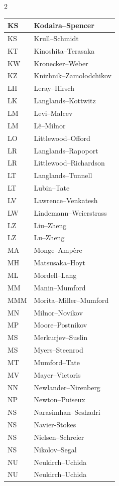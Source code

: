 \documentclass{amsart}
\numberwithin{equation}{section}
\theoremstyle{plain}
\numberwithin{equation}{section}
\theoremstyle{remark}
\begin{document}
\begin{multicols}{2}
{\begin{longtable}{l|l}
KS & Kodaira--Spencer\\ \hline
KS & Krull--Schmidt\\ \hline
KT & Kinoshita--Terasaka\\ \hline
KW & Kronecker--Weber\\ \hline
KZ & Knizhnik--Zamolodchikov\\ \hline
LH & Leray--Hirsch\\ \hline
LK & Langlands--Kottwitz\\ \hline
LM & Levi--Malcev\\ \hline
LM & Lê--Milnor\\ \hline
LO & Littlewood--Offord\\ \hline
LR & Langlands--Rapoport\\ \hline
LR & Littlewood--Richardson\\ \hline
LT & Langlands--Tunnell\\ \hline
LT & Lubin--Tate\\ \hline
LV & Lawrence--Venkatesh\\ \hline
LW & Lindemann--Weierstrass\\ \hline
LZ & Liu--Zheng\\ \hline
LZ & Lu--Zheng\\ \hline
MA & Monge--Ampère\\ \hline
MH & Matsusaka--Hoyt\\ \hline
ML & Mordell--Lang\\ \hline
MM & Manin--Mumford\\ \hline
MMM & Morita--Miller--Mumford\\ \hline
MN & Milnor--Novikov\\ \hline
MP & Moore--Postnikov\\ \hline
MS & Merkurjev--Suslin\\ \hline
MS & Myers--Steenrod\\ \hline
MT & Mumford--Tate\\ \hline
MV & Mayer--Vietoris\\ \hline
NN & Newlander--Nirenberg\\ \hline
NP & Newton--Puiseux\\ \hline
NS & Narasimhan--Seshadri\\ \hline
NS & Navier-Stokes\\ \hline
NS & Nielsen--Schreier\\ \hline
NS & Nikolov--Segal\\ \hline
NU & Neukirch--Uchida\\ \hline
NU & Neukirch--Uchida\\ \hline

\end{longtable}}
\end{multicols}
\end{document}

